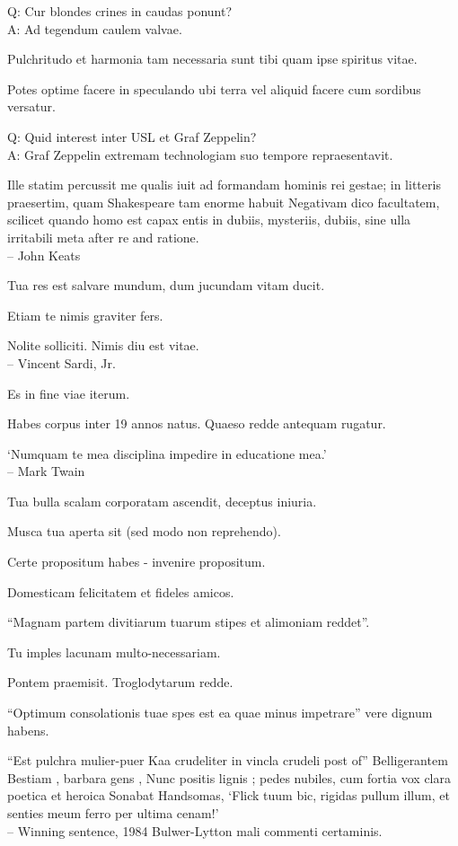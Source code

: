 \documentclass[titlepage,12pt]{memoir}
\begin{document}
Q: Cur blondes crines in caudas ponunt?\\
A: Ad tegendum caulem valvae.

 Pulchritudo et harmonia tam necessaria sunt tibi quam ipse spiritus vitae.

Potes optime facere in speculando ubi terra vel aliquid facere cum sordibus
versatur.

Q: Quid interest inter USL et Graf Zeppelin?\\
A: Graf Zeppelin extremam technologiam suo tempore repraesentavit.

Ille statim percussit me qualis iuit ad formandam hominis rei gestae;
in litteris praesertim, quam Shakespeare tam enorme habuit
Negativam dico facultatem, scilicet quando homo est capax entis
in dubiis, mysteriis, dubiis, sine ulla irritabili meta
after re and ratione.
\\-- John Keats

Tua res est salvare mundum, dum jucundam vitam ducit.

Etiam te nimis graviter fers.

Nolite solliciti. Nimis diu est vitae.
\\-- Vincent Sardi, Jr.

Es in fine viae iterum.

Habes corpus inter 19 annos natus. Quaeso redde antequam rugatur.

‘Numquam te mea disciplina impedire in educatione mea.’
\\-- Mark Twain

Tua bulla scalam corporatam ascendit, deceptus iniuria.

 Musca tua aperta sit (sed modo non reprehendo).

Certe propositum habes - invenire propositum.

 Domesticam felicitatem et fideles amicos.

“Magnam partem divitiarum tuarum stipes et alimoniam reddet”.

Tu imples lacunam multo-necessariam.

Pontem praemisit. Troglodytarum redde.

“Optimum consolationis tuae spes est ea quae minus impetrare”
vere dignum habens.

“Est pulchra mulier-puer Kaa crudeliter in vincla crudeli post of”
Belligerantem Bestiam , barbara gens , Nunc positis lignis ;
pedes nubiles, cum fortia vox clara poetica et heroica
Sonabat Handsomas, ‘Flick tuum bic, rigidas pullum illum, et senties meum
ferro per ultima cenam!’
\\-- Winning sentence, 1984 Bulwer-Lytton mali commenti certaminis.
\end{document}
